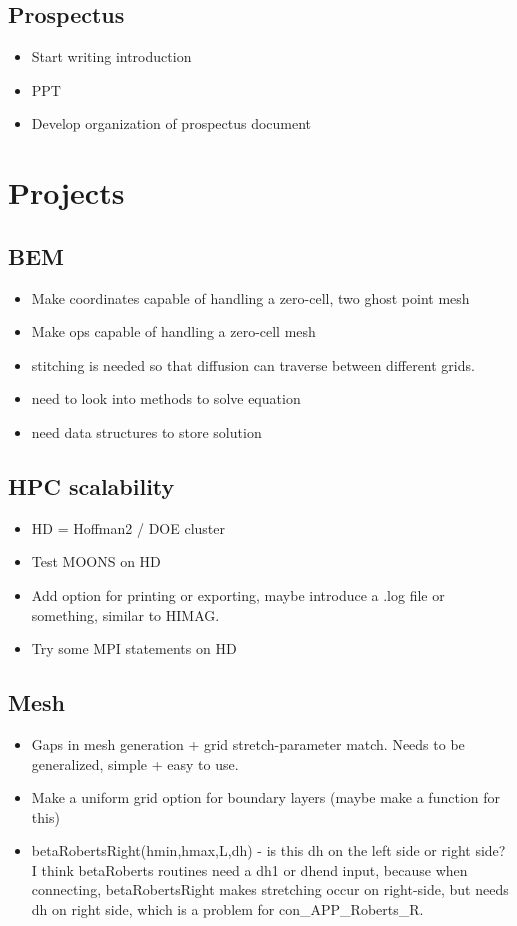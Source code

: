 \documentclass[11pt]{article}
\begin{document}
\subsection{Prospectus}
\begin{itemize}
\setlength\itemsep{-1em}
\item Start writing introduction
\item PPT
\item Develop organization of prospectus document
\end{itemize}

\section{Projects}

\subsection{BEM}
\begin{itemize}
\setlength\itemsep{-1em}
\item Make coordinates capable of handling a zero-cell, two ghost point mesh \Checkmark
\item Make ops capable of handling a zero-cell mesh
\item stitching is needed so that diffusion can traverse between different grids.
\item need to look into methods to solve equation
\item need data structures to store solution
\end{itemize}

\subsection{HPC scalability}
\begin{itemize}
\setlength\itemsep{-1em}
\item HD = Hoffman2 / DOE cluster
\item Test MOONS on HD
\item Add option for printing or exporting, maybe introduce a .log file or something, similar to HIMAG.
\item Try some MPI statements on HD
\end{itemize}

\subsection{Mesh}
\begin{itemize}
\setlength\itemsep{-1em}
\item Gaps in mesh generation + grid stretch-parameter match. Needs to be generalized, simple + easy to use.
\item Make a uniform grid option for boundary layers (maybe make a function for this)
\item betaRobertsRight(hmin,hmax,L,dh) - is this dh on the left side or right side? I think betaRoberts routines need a dh1 or dhend input, because when connecting, betaRobertsRight makes stretching occur on right-side, but needs dh on right side, which is a problem for con\_APP\_Roberts\_R.
\end{itemize}
\end{document}
